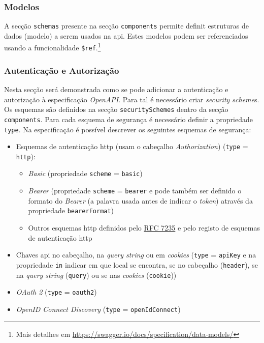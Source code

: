 \subsubsection{Modelos}
A secção \texttt{schemas} presente na secção \texttt{components} permite definit estruturas de dados (modelo) a serem usados na \acrshort{api}. Estes modelos podem ser referenciados usando a funcionalidade \texttt{\$ref}.\footnote{Mais detalhes em \url{https://swagger.io/docs/specification/data-models/}}

\subsubsection{Autenticação e Autorização}\label{sec:authSwagger}
Nesta secção será demonstrada como se pode adicionar a autenticação e autorização à especificação \textit{OpenAPI}. Para tal é necessário criar \textit{security scheme}s. Os esquemas são definidos na secção \texttt{securitySchemes} dentro da secção \texttt{components}. Para cada esquema de segurança é necessário definir a propriedade \texttt{type}. Na especificação é possível descrever os seguintes esquemas de segurança:
\begin{itemize}
    \item Esquemas de autenticação \acrshort{http} (usam o cabeçalho \textit{Authorization}) (\texttt{type} = \texttt{http}):
    \begin{itemize}
        \item \textit{Basic} (propriedade \texttt{scheme} = \texttt{basic})
        \item \textit{Bearer} (propriedade \texttt{scheme} = \texttt{bearer} e pode também ser definido o formato do \textit{Bearer} (a palavra usada antes de indicar o \textit{token}) através da propriedade \texttt{bearerFormat})
        \item Outros esquemas \acrshort{http} definidos pelo \href{https://tools.ietf.org/html/rfc7235}{RFC 7235} e pelo registo de esquemas de autenticação \acrshort{http}
    \end{itemize}
    \item Chaves \acrshort{api} no cabeçalho, na \textit{query string} ou em \textit{cookies} (\texttt{type} = \texttt{apiKey} e na propriedade \texttt{in} indicar em que local se encontra, se no cabeçalho (\texttt{header}), se na \textit{query string} (\texttt{query}) ou se nas \textit{cookies} (\texttt{cookie}))
    \item \textit{OAuth 2} (\texttt{type} = \texttt{oauth2})
    \item \textit{OpenID Connect Discovery} (\texttt{type} = \texttt{openIdConnect})
\end{itemize}

